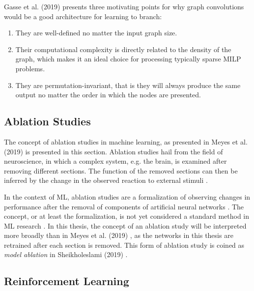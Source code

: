 Gasse et al. (2019) \cite{gasse2019exact} presents three motivating points for why graph convolutions would be a good architecture for learning to branch:
\begin{enumerate}[label=(\roman*)]
    \item They are well-defined no matter the input graph size.
    \item Their computational complexity is directly related
to the density of the graph, which makes it an ideal choice for processing typically sparse \gls{MILP}
problems.
    \item They are permutation-invariant, that is they will always produce the same output no
matter the order in which the nodes are presented.
\end{enumerate}






\subsection{Ablation Studies}

The concept of ablation studies in machine learning, as presented in 
Meyes et al. (2019) \cite{meyes2019ablation} is presented in this section.
Ablation studies hail from the field of neuroscience, in which a complex system, e.g. the brain, is examined after removing different sections. The function of the removed sections can then be inferred by the change in the observed reaction to external stimuli \cite{meyes2019ablation}.

In the context of \gls{ML}, ablation studies are a formalization of observing changes in performance after the removal of components of artificial neural networks \cite{meyes2019ablation}.  
The concept, or at least the formalization, is not yet considered a standard method in \gls{ML} research \cite{sheikholeslami2019ablation}.
In this thesis, the concept of an ablation study will be interpreted more broadly than in Meyes et al. (2019) \cite{meyes2019ablation}, as the networks in this thesis are retrained after each section is removed. This form of ablation study is coined as \textit{model ablation} in Sheikholeslami (2019) \cite{sheikholeslami2019ablation}.





\subsection{Reinforcement Learning}

